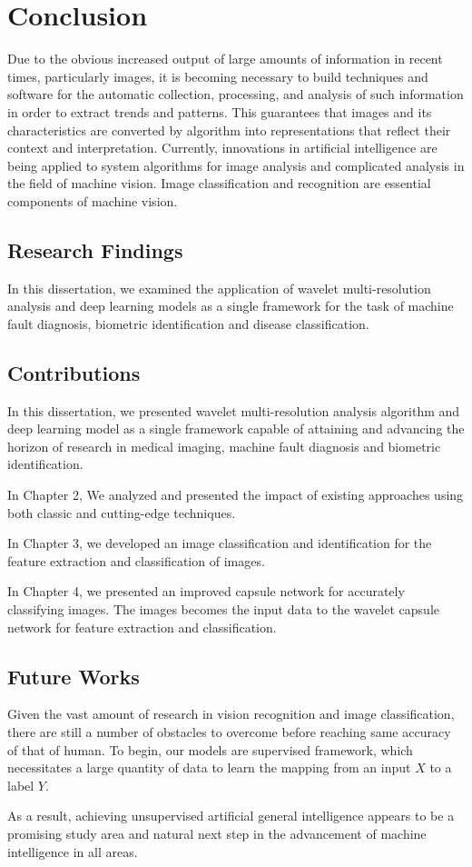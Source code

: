 \documentclass{standalone}
\begin{document}
\chapter{Conclusion}
\label{Chapter5}
Due to the obvious increased output of large amounts of information in recent times, particularly images, it is becoming necessary to build techniques and software for the automatic collection, processing, and analysis of such information in order to extract trends and patterns. This guarantees that images and its characteristics are converted by algorithm into representations that reflect their context and interpretation. Currently, innovations in artificial intelligence are being applied to system algorithms for image analysis and complicated analysis in the field of machine vision. Image classification and recognition are essential components of machine vision. 


\section{Research Findings}
In this dissertation, we examined the application of wavelet multi-resolution analysis and deep learning models as a single framework for the task of machine fault diagnosis, biometric identification and disease classification. 

\section{Contributions}
In this dissertation, we presented wavelet multi-resolution analysis algorithm and deep learning model as a single framework capable of attaining and advancing the horizon of research in medical imaging, machine fault diagnosis and biometric identification. 

In Chapter 2, We analyzed and presented the impact of existing approaches using both classic and cutting-edge techniques.

In Chapter 3, we developed an  image classification and identification for the feature extraction and classification of images.

In Chapter 4, we presented an improved capsule network for accurately classifying images. The images becomes the input data to the wavelet capsule network for feature extraction and classification.


\section{Future Works}
Given the vast amount of research in vision recognition and image classification, there are still a number of obstacles to overcome before reaching same accuracy of that of human. To begin, our models are supervised framework, which necessitates a large quantity of data to learn the mapping from an input $X$ to a label $Y$. 

As a result, achieving unsupervised artificial general intelligence appears to be a promising study area and natural next step in the advancement of machine intelligence in all areas.
\end{document}
